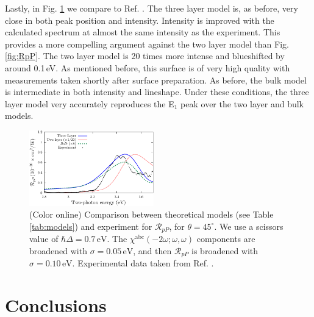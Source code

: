 \documentclass[prb,superscriptaddress,showpacs,twocolumn,letterpaper]{revtex4}
\begin{document}
Lastly, in Fig. \ref{fig:mitchellRpP} we compare to Ref.
. The three layer model is, as before, very close in
both peak position and intensity. Intensity is improved with the calculated
spectrum at almost the same intensity as the experiment. This provides a more
compelling argument against the two layer model than Fig. \ref{fig:RpP}. The two
layer model is 20 times more intense and blueshifted by around 0.1\,eV. As
mentioned before, this surface is of very high quality with measurements taken
shortly after surface preparation. As before, the bulk model is intermediate in
both intensity and lineshape. Under these conditions, the three layer model very
accurately reproduces the E$_{1}$ peak over the two layer and bulk models.

\begin{figure}[t]
\centering
\includegraphics[width=0.48\textwidth]{fig8}
\caption{(Color online) Comparison between theoretical models (see Table
\ref{tab:models}) and experiment for $\mathcal{R}_{pP}$, for
$\theta=45^{\circ}$. We use a scissors value of $\hbar\Delta = 0.7\,\text{eV}$.
The $\chi^{\mathrm{abc}}(-2\omega;\omega,\omega)$ components are broadened with
$\sigma=0.05\,\text{eV}$, and then $\mathcal{R}_{pP}$ is broadened with
$\sigma=0.10\,\text{eV}$. Experimental data taken from Ref.
.\label{fig:mitchellRpP}}
\end{figure}


\section{Conclusions}\label{sec:conclusions}
\end{document}

